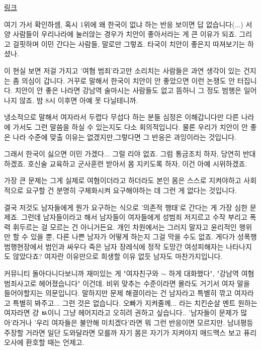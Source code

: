 \vspace{5mm}

\href{http://www.numbeo.com/crime/rankings_by_country.jsp}{링크}
\vspace{5mm}

여기 가서 확인하셈, 혹시 1위에 왜 한국이 없냐 하는 반응 보이면 답 없습니다(...)
서양 사람들이 우리나라에 눌러앉는 경우가 치안이 좋아서라는 게 큰 이유가 되죠.
그리고 걸핏하며 이민 간다는 사람들, 말로만 그렇죠. 타국이 치안이 좋은지 따져보기는 하셨나.
\vspace{5mm}

이 현실 보면 저걸 가지고 '여혐 범죄'라고만 소리치는 사람들은 과연 생각이 있는 건지는 좀 의심이 갑니다.
거꾸로 말해서 한국이 치안이 안 좋았으면 이런 논쟁도 안 터집니다.
치안이 안 좋은 나라면 강남역 술마시는 사람들도 없고 뜸하니 그 정도 범행은 일어나지 않죠.
밤 8시 이후면 아예 못 다닐테니까.
\vspace{5mm}

냉소적으로 말해서 여자라서 두렵다 무섭다 하는 분들 심정은 이해갑니다만
다른 나라에 가서도 그런 말씀을 하실 수 있는지도 다소 회의적입니다.
물론 우리가 치안이 안 좋은 나라 수준에 맞출 이유는 없겠지만,그렇다면 그 반응은 과잉이라는 것입니다.
\vspace{5mm}

그래서 한국이 싫으면 이민 가겠다... 그럴 리야 없죠.
그럼 통금조치 하자, 당연히 반대하겠죠.
호신술 교육하고 군사훈련 받아서 몸 지키도록 하자, 이건 아예 시위하겠죠.
\vspace{5mm}

가장 큰 문제는 그게 실제로 여혐이더라고 하더라도 본인 몸은 스스로 지켜야하고
사회적으로 요구할 건 분명히 구체화시켜 요구해야하는 데 그런 게 없다는 것입니다.
\vspace{5mm}

결국 저것도 남자들에게 뭔가 요구하는 식으로 '의존적 행태'로 간다는 게 가장 심한 문제죠.
그런데 남자들이라고 해서 남자들이 여자들에게 성범죄 저지르고 수작 부리고 폭력 휘두르는 걸 모르는 건 아니거든요.
개인 차원에서는 그러지 말자고 윤리적인 행위만 할 수 있을 뿐, 다른 나쁜 남자가 어떻게 하는지 그걸 막을 수도 없죠.
게다가 성폭행 범행현장에서 범인과 싸우다 죽은 남자 장레식에 정작 도망간 여성피해자는 나타나지도 않았다죠?
여자란 이유만으로 희생할 이유 없듯 남자도 마찬가지입니다.
\vspace{5mm}

커뮤니티 돌아다니다보니까 재미있는 게 "여자친구와 $\sim$ 하게 대화했다", "강남역 여혐 범죄사고로 헤어졌습니다" 이건데.
비위 맞추는 수준이라면 몰라도 거기서 여자 말을 들어야할지는 의문입니다.
말하지만 문제 해결이라는 건 남자라고 특별히 깎고 여자라고 특별히 봐주고... 그런 것은 없습니다.
오빠가 지켜줄께... 라는 치킨순살 멘트 원하는 여자라면 걍 ㅄ이니 그냥 헤어지라고 오히려 권하고 싶습니다..
'남자들이 문제가 많아'라거나 '우리 여자들은 불안해 미치겠다'라면 뭐 그런 반응이면 모르지만.
남녀평등 주장할 거라면 일단 도와달라면 모를까 자기 몸은 자기가 지켜야지
매드맥스 보고 퓨리오사에 환호할 때는 언제고.
\vspace{5mm}

